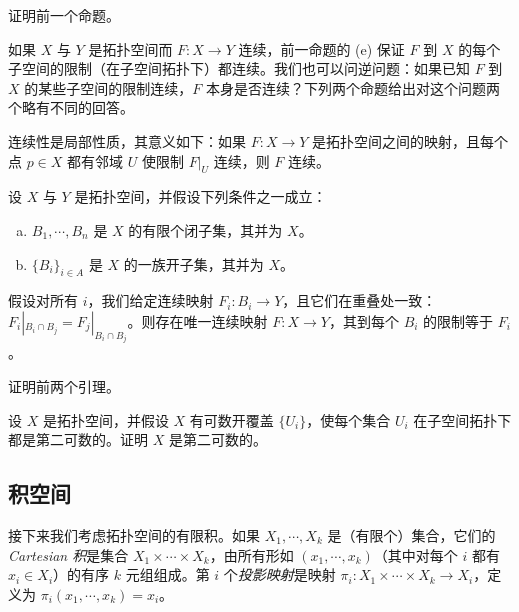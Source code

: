 \documentclass[../../main.tex]{subfiles}
\begin{document}
\begin{exercise}\label{exercise:appA-A-18}
证明前一个命题。
\end{exercise}

如果 $X$ 与 $Y$ 是拓扑空间而 $F:X\to Y$ 连续，前一命题的 (e) 保证 $F$ 到 $X$ 的每个子空间的限制（在子空间拓扑下）都连续。我们也可以问逆问题：如果已知 $F$ 到 $X$ 的某些子空间的限制连续，$F$ 本身是否连续？下列两个命题给出对这个问题两个略有不同的回答。

\begin{lemma}[连续性是局部性质]\label{lemma:appA-continuity-local}
连续性是局部性质，其意义如下：如果 $F:X\to Y$ 是拓扑空间之间的映射，且每个点 $p\in X$ 都有邻域 $U$ 使限制 $F|_U$ 连续，则 $F$ 连续。
\end{lemma}

\begin{lemma}[连续映射的粘合引理]\label{lemma:appA-gluing-lemma}
设 $X$ 与 $Y$ 是拓扑空间，并假设下列条件之一成立：
\begin{enumerate}[(a)]
\item $B_1,\cdots ,B_n$ 是 $X$ 的有限个闭子集，其并为 $X$。
\item $\{B_i\}_{i\in A}$ 是 $X$ 的一族开子集，其并为 $X$。
\end{enumerate}
假设对所有 $i$，我们给定连续映射 $F_i:B_i\to Y$，且它们在重叠处一致：$F_i|_{B_i\cap B_j}=F_j|_{B_i\cap B_j}$。则存在唯一连续映射 $F:X\to Y$，其到每个 $B_i$ 的限制等于 $F_i$。
\end{lemma}

\begin{exercise}\label{exercise:appA-A-21}
证明前两个引理。
\end{exercise}

\begin{exercise}\label{exercise:appA-A-22}
设 $X$ 是拓扑空间，并假设 $X$ 有可数开覆盖 $\{U_i\}$，使每个集合 $U_i$ 在子空间拓扑下都是第二可数的。证明 $X$ 是第二可数的。
\end{exercise}

\subsection*{积空间}

接下来我们考虑拓扑空间的有限积。如果 $X_1,\cdots ,X_k$ 是（有限个）集合，它们的\emph{Cartesian 积}是集合 $X_1\times\cdots\times X_k$，由所有形如 $(x_1,\cdots ,x_k)$（其中对每个 $i$ 都有 $x_i\in X_i$）的有序 $k$ 元组组成。第 $i$ 个\emph{投影映射}是映射 $\pi_i:X_1\times\cdots\times X_k\to X_i$，定义为 $\pi_i(x_1,\cdots ,x_k)=x_i$。
\end{document}
